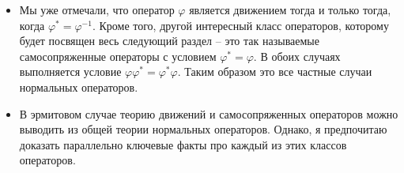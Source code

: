 \begin{itemize}
\item Мы уже отмечали, что оператор $\varphi$ является движением тогда и только тогда, когда $\varphi^* = \varphi^{-1}$.
Кроме того, другой интересный класс операторов, которому будет посвящен весь следующий раздел -- это так называемые самосопряженные операторы с условием $\varphi^* = \varphi$.
В обоих случаях выполняется условие $\varphi \varphi^* = \varphi^*\varphi$.
Таким образом это все частные случаи нормальных операторов.

\item В эрмитовом случае теорию движений и самосопряженных операторов можно выводить из общей теории нормальных операторов.
Однако, я предпочитаю доказать параллельно ключевые факты про каждый из этих классов операторов.
\end{itemize}
